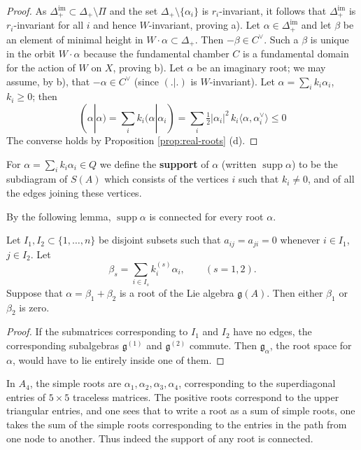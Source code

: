 \documentclass[12pt]{article}
\begin{document}
\begin{proof}
    As $\Delta^{\mathrm{im}}_+ \subset \Delta_+ \setminus \Pi$ and the set
    $\Delta_+\setminus\{\alpha_i\}$ is $r_i$-invariant, it follows
    that $\Delta^{\mathrm{im}}_+$ is $r_i$-invariant for all $i$ and hence
    $W$-invariant, proving a). Let $\alpha \in \Delta^{\mathrm{im}}_+$ and let $\beta$
    be an element of minimal height in $W\cdot\alpha \subset \Delta_+$. Then $-\beta
        \in C^\vee$. Such a $\beta$ is unique in the orbit $W\cdot\alpha$ because the fundamental chamber $C$ is a fundamental domain for the action of $W$ on $X$, proving b). Let $\alpha$ be an imaginary root; we may assume, by b), that
    $-\alpha \in C^\vee$ (since $(.|.)$ is $W$-invariant). Let
    $\alpha = \sum_i k_i \alpha_i$, $k_i \geq 0$; then
    \[
        (\alpha|\alpha) = \sum_i k_i (\alpha|\alpha_i)
        = \sum_i \tfrac{1}{2}|\alpha_i|^2\, k_i \langle \alpha, \alpha_i^\vee \rangle
        \leq 0
    \]
    The converse holds by Proposition \ref{prop:real-roots} (d).
\end{proof}
\begin{definition}
    For $\alpha = \sum_i k_i \alpha_i \in Q$ we define the \textbf{support} of $\alpha$
    (written $\operatorname{supp}\alpha$) to be the subdiagram of $S(A)$ which consists
    of the vertices $i$ such that $k_i \neq 0$, and of all the edges joining these
    vertices.
\end{definition}
By the following lemma, $\operatorname{supp}\alpha$ is connected for every root
$\alpha$.
\begin{lemma}
    Let $I_1, I_2 \subset \{1,\dots,n\}$ be disjoint subsets such that
    $a_{ij} = a_{ji} = 0$ whenever $i \in I_1$, $j \in I_2$.
    Let
    \[
        \beta_s = \sum_{i \in I_s} k_i^{(s)} \alpha_i, \qquad (s=1,2).
    \]
    Suppose that $\alpha = \beta_1 + \beta_2$ is a root of the Lie algebra
    $\mathfrak{g}(A)$. Then either $\beta_1$ or $\beta_2$ is zero.
\end{lemma}
\begin{proof}
    If the submatrices corresponding to $I_1$ and $I_2$ have no edges, the corresponding subalgebras $\mathfrak{g}^{(1)}$ and $\mathfrak{g}^{(2)}$ commute. Then $\mathfrak{g}_\alpha$, the root space for $\alpha$, would have to lie entirely inside one of them.
\end{proof}

\begin{example}
    In $A_4$, the simple roots are $\alpha_1, \alpha_2, \alpha_3, \alpha_4$, corresponding to the superdiagonal entries of $5\times 5$ traceless matrices. The positive roots correspond to the upper triangular entries, and one sees that to write a root as a sum of simple roots, one takes the sum of the simple roots corresponding to the entries in the path from one node to another. Thus indeed the support of any root is connected.
\end{example}
\end{document}

